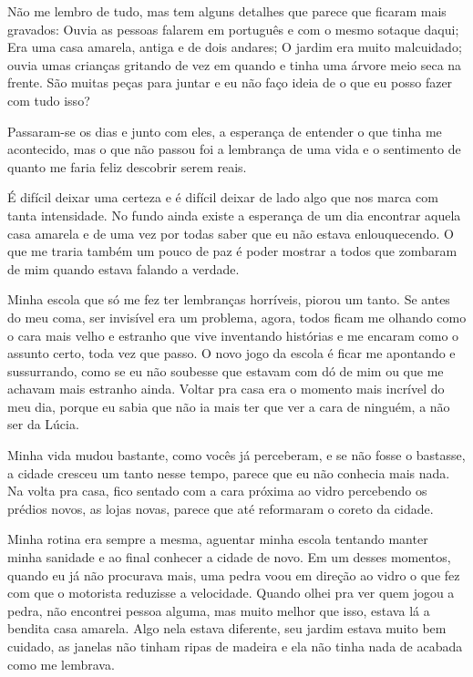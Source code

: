 Não me lembro de tudo, mas tem alguns detalhes que parece que ficaram mais gravados: Ouvia as pessoas falarem em português e com o mesmo sotaque daqui; Era uma casa amarela, antiga e de dois andares; O jardim era muito malcuidado; ouvia umas crianças gritando de vez em quando e tinha uma árvore meio seca na frente. São muitas peças para juntar e eu não faço ideia de o que eu posso fazer com tudo isso?

Passaram-se os dias e junto com eles, a esperança de entender o que tinha me acontecido, mas o que não passou foi a lembrança de uma vida e o sentimento de quanto me faria feliz descobrir serem reais.

É difícil deixar uma certeza e é difícil deixar de lado algo que nos marca com tanta intensidade. No fundo ainda existe a esperança de um dia encontrar aquela casa amarela e de uma vez por todas saber que eu não estava enlouquecendo. O que me traria também um pouco de paz é poder mostrar a todos que zombaram de mim quando estava falando a verdade.

Minha escola que só me fez ter lembranças horríveis, piorou um tanto. Se antes do meu coma, ser invisível era um problema, agora, todos ficam me olhando como o cara mais velho e estranho que vive inventando histórias e me encaram como o assunto certo, toda vez que passo. O novo jogo da escola é ficar me apontando e sussurrando, como se eu não soubesse que estavam com dó de mim ou que me achavam mais estranho ainda. Voltar pra casa era o momento mais incrível do meu dia, porque eu sabia que não ia mais ter que ver a cara de ninguém, a não ser da Lúcia. 

Minha vida mudou bastante, como vocês já perceberam, e se não fosse o bastasse, a cidade cresceu um tanto nesse tempo, parece que eu não conhecia mais nada. Na volta pra casa, fico sentado com a cara próxima ao vidro percebendo os prédios novos, as lojas novas, parece que até reformaram o coreto da cidade. 

Minha rotina era sempre a mesma, aguentar minha escola tentando manter minha sanidade e ao final conhecer a cidade de novo. Em um desses momentos, quando eu já não procurava mais, uma pedra voou em direção ao vidro o que fez com que o motorista reduzisse a velocidade. Quando olhei pra ver quem jogou a pedra, não encontrei pessoa alguma, mas muito melhor que isso, estava lá a bendita casa amarela. Algo nela estava diferente, seu jardim estava muito bem cuidado, as janelas não tinham ripas de madeira e ela não tinha nada de acabada como me lembrava.

